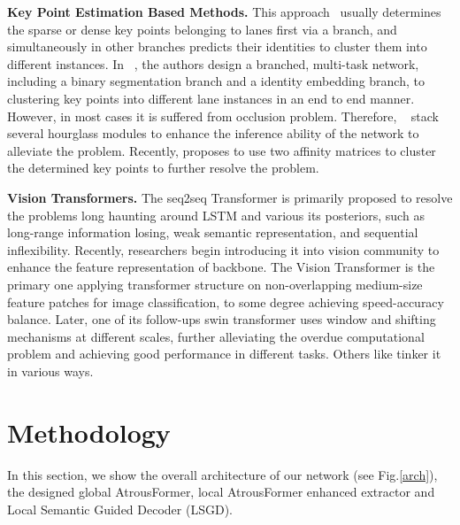 \documentclass[preprint,12pt,review]{elsarticle}
\begin{document}
\textbf{Key Point Estimation Based Methods.} This approach~\cite{key1,PINet,laneaf,curvelane} usually determines the sparse or dense key points belonging to lanes first via a branch, and simultaneously in other branches predicts their identities to cluster them into different instances. In ~\cite{PINet}, the authors design a branched, multi-task network, including a binary segmentation branch and a identity embedding branch, to clustering key points into different lane instances in an end to end manner. However, in most cases it is suffered from occlusion problem. Therefore, ~\cite{PINet} stack several hourglass modules to enhance the inference ability of the network to alleviate the problem. Recently, \cite{laneaf} proposes to use two affinity matrices to cluster the determined key points to further resolve the problem.



\textbf{Vision Transformers.} The seq2seq Transformer\cite{transformer} is primarily proposed to resolve the problems long haunting around LSTM and various its posteriors, such as long-range information losing, weak semantic representation, and sequential inflexibility. Recently, researchers begin introducing it into vision community to enhance the feature representation of backbone. The Vision Transformer \cite{vit} is the primary one applying  transformer structure on non-overlapping medium-size feature patches for image classification, to some degree achieving speed-accuracy balance.  Later, one of its follow-ups swin transformer \cite{swin} uses window and shifting mechanisms at different scales, further alleviating the overdue computational problem and achieving good performance in different tasks. Others like \cite{pvt, conformer} tinker it in various ways.

\section{Methodology}
\label{sec:methods}
In this section, we show the overall architecture of our network (see Fig.\ref{arch}), the designed global AtrousFormer, local AtrousFormer enhanced extractor and Local Semantic Guided Decoder (LSGD). 
\end{document}

